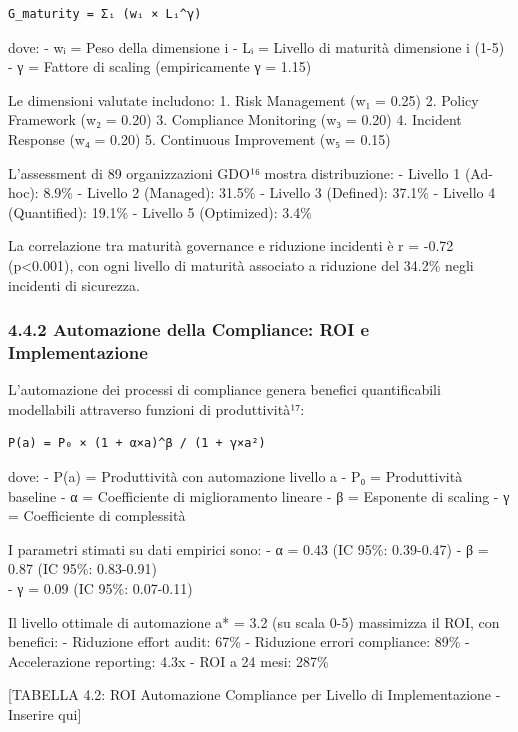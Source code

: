 \documentclass[12pt,a4paper,oneside]{book}
\begin{document}
\begin{verbatim}
G_maturity = Σᵢ (wᵢ × Lᵢ^γ)
\end{verbatim}

dove: - wᵢ = Peso della dimensione i - Lᵢ = Livello di maturità
dimensione i (1-5) - γ = Fattore di scaling (empiricamente γ = 1.15)

Le dimensioni valutate includono: 1. Risk Management (w₁ = 0.25) 2.
Policy Framework (w₂ = 0.20) 3. Compliance Monitoring (w₃ = 0.20) 4.
Incident Response (w₄ = 0.20) 5. Continuous Improvement (w₅ = 0.15)

L'assessment di 89 organizzazioni GDO¹⁶ mostra distribuzione: - Livello
1 (Ad-hoc): 8.9\% - Livello 2 (Managed): 31.5\% - Livello 3 (Defined):
37.1\% - Livello 4 (Quantified): 19.1\% - Livello 5 (Optimized): 3.4\%

La correlazione tra maturità governance e riduzione incidenti è r =
-0.72 (p\textless0.001), con ogni livello di maturità associato a
riduzione del 34.2\% negli incidenti di sicurezza.

\subsubsection{4.4.2 Automazione della Compliance: ROI e
Implementazione}\label{automazione-della-compliance-roi-e-implementazione}

L'automazione dei processi di compliance genera benefici quantificabili
modellabili attraverso funzioni di produttività¹⁷:

\begin{verbatim}
P(a) = P₀ × (1 + α×a)^β / (1 + γ×a²)
\end{verbatim}

dove: - P(a) = Produttività con automazione livello a - P₀ =
Produttività baseline - α = Coefficiente di miglioramento lineare - β =
Esponente di scaling - γ = Coefficiente di complessità

I parametri stimati su dati empirici sono: - α = 0.43 (IC 95\%:
0.39-0.47) - β = 0.87 (IC 95\%: 0.83-0.91)\\
- γ = 0.09 (IC 95\%: 0.07-0.11)

Il livello ottimale di automazione a* = 3.2 (su scala 0-5) massimizza il
ROI, con benefici: - Riduzione effort audit: 67\% - Riduzione errori
compliance: 89\% - Accelerazione reporting: 4.3x - ROI a 24 mesi: 287\%

{[}TABELLA 4.2: ROI Automazione Compliance per Livello di
Implementazione - Inserire qui{]}
\end{document}
